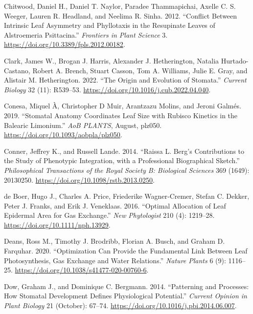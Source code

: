 \documentclass[
  12pt,
]{article}
\newlength{\cslhangindent}
\newlength{\cslentryspacingunit} %
\newenvironment{CSLReferences}[2] %
 {%
  \setlength{\parindent}{0pt}
  \ifodd #1
  \let\oldpar\par
  \def\par{\hangindent=\cslhangindent\oldpar}
  \fi
  \setlength{\parskip}{#2\cslentryspacingunit}
 }%
 {}
\begin{document}
\begin{CSLReferences}{1}{0}
\leavevmode{}%
Chitwood, Daniel H., Daniel T. Naylor, Paradee Thammapichai, Axelle C. S. Weeger, Lauren R. Headland, and Neelima R. Sinha. 2012. {``Conflict Between {Intrinsic} {Leaf} {Asymmetry} and {Phyllotaxis} in the {Resupinate} {Leaves} of {Alstroemeria} Psittacina.''} \emph{Frontiers in Plant Science} 3. \url{https://doi.org/10.3389/fpls.2012.00182}.

\leavevmode{}%
Clark, James W., Brogan J. Harris, Alexander J. Hetherington, Natalia Hurtado-Castano, Robert A. Brench, Stuart Casson, Tom A. Williams, Julie E. Gray, and Alistair M. Hetherington. 2022. {``The Origin and Evolution of Stomata.''} \emph{Current Biology} 32 (11): R539--53. \url{https://doi.org/10.1016/j.cub.2022.04.040}.

\leavevmode{}%
Conesa, Miquel À, Christopher D Muir, Arantzazu Molins, and Jeroni Galmés. 2019. {``Stomatal Anatomy Coordinates Leaf Size with {Rubisco} Kinetics in the {Balearic} {Limonium}.''} \emph{AoB PLANTS}, August, plz050. \url{https://doi.org/10.1093/aobpla/plz050}.

\leavevmode{}%
Conner, Jeffrey K., and Russell Lande. 2014. {``Raissa {L}. {Berg}'s Contributions to the Study of Phenotypic Integration, with a Professional Biographical Sketch.''} \emph{Philosophical Transactions of the Royal Society B: Biological Sciences} 369 (1649): 20130250. \url{https://doi.org/10.1098/rstb.2013.0250}.

\leavevmode{}%
de Boer, Hugo J., Charles A. Price, Friederike Wagner‐Cremer, Stefan C. Dekker, Peter J. Franks, and Erik J. Veneklaas. 2016. {``Optimal Allocation of Leaf Epidermal Area for Gas Exchange.''} \emph{New Phytologist} 210 (4): 1219--28. \url{https://doi.org/10.1111/nph.13929}.

\leavevmode{}%
Deans, Ross M., Timothy J. Brodribb, Florian A. Busch, and Graham D. Farquhar. 2020. {``Optimization Can Provide the Fundamental Link Between Leaf Photosynthesis, Gas Exchange and Water Relations.''} \emph{Nature Plants} 6 (9): 1116--25. \url{https://doi.org/10.1038/s41477-020-00760-6}.

\leavevmode{}%
Dow, Graham J., and Dominique C. Bergmann. 2014. {``Patterning and Processes: How Stomatal Development Defines Physiological Potential.''} \emph{Current Opinion in Plant Biology} 21 (October): 67--74. \url{https://doi.org/10.1016/j.pbi.2014.06.007}.


\end{CSLReferences}
\end{document}
